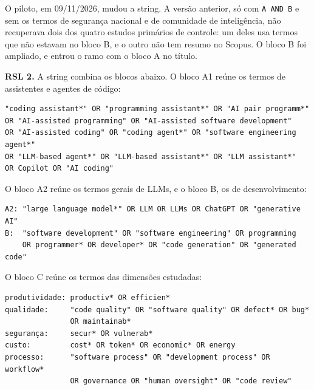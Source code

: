 
O piloto, em 09/11/2026, mudou a string. A versão anterior, só com
\texttt{A AND B} e sem os termos de segurança nacional e de comunidade de
inteligência, não recuperava dois dos quatro estudos primários de controle:
um deles usa termos que não estavam no bloco B, e o outro não tem resumo no
Scopus. O bloco B foi ampliado, e entrou o ramo com o bloco A no título.

\textbf{RSL 2.} A string combina os blocos abaixo. O bloco A1 reúne os termos
de assistentes e agentes de código:

{\footnotesize
\begin{verbatim}
"coding assistant*" OR "programming assistant*" OR "AI pair programm*"
OR "AI-assisted programming" OR "AI-assisted software development"
OR "AI-assisted coding" OR "coding agent*" OR "software engineering agent*"
OR "LLM-based agent*" OR "LLM-based assistant*" OR "LLM assistant*"
OR Copilot OR "AI coding"
\end{verbatim}
}

\noindent O bloco A2 reúne os termos gerais de LLMs, e o bloco B, os de
desenvolvimento:

{\footnotesize
\begin{verbatim}
A2: "large language model*" OR LLM OR LLMs OR ChatGPT OR "generative AI"
B:  "software development" OR "software engineering" OR programming
    OR programmer* OR developer* OR "code generation" OR "generated code"
\end{verbatim}
}

\noindent O bloco C reúne os termos das dimensões estudadas:

{\footnotesize
\begin{verbatim}
produtividade: productiv* OR efficien*
qualidade:     "code quality" OR "software quality" OR defect* OR bug*
               OR maintainab*
segurança:     secur* OR vulnerab*
custo:         cost* OR token* OR economic* OR energy
processo:      "software process" OR "development process" OR workflow*
               OR governance OR "human oversight" OR "code review"
\end{verbatim}
}

